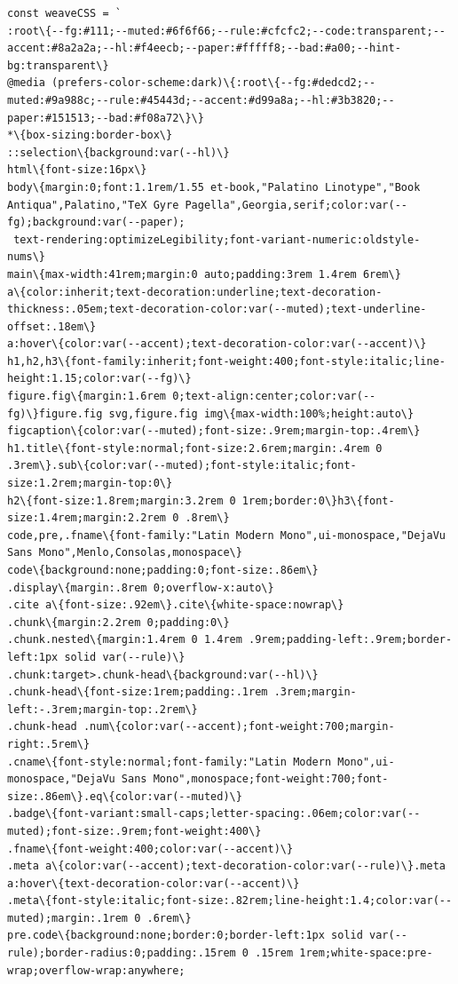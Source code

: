 \documentclass[10pt,a4paper]{article}
\newcounter{chunk}
\begin{document}
\begin{Verbatim}
const weaveCSS = `
:root\{--fg:#111;--muted:#6f6f66;--rule:#cfcfc2;--code:transparent;--accent:#8a2a2a;--hl:#f4eecb;--paper:#fffff8;--bad:#a00;--hint-bg:transparent\}
@media (prefers-color-scheme:dark)\{:root\{--fg:#dedcd2;--muted:#9a988c;--rule:#45443d;--accent:#d99a8a;--hl:#3b3820;--paper:#151513;--bad:#f08a72\}\}
*\{box-sizing:border-box\}
::selection\{background:var(--hl)\}
html\{font-size:16px\}
body\{margin:0;font:1.1rem/1.55 et-book,"Palatino Linotype","Book Antiqua",Palatino,"TeX Gyre Pagella",Georgia,serif;color:var(--fg);background:var(--paper);
 text-rendering:optimizeLegibility;font-variant-numeric:oldstyle-nums\}
main\{max-width:41rem;margin:0 auto;padding:3rem 1.4rem 6rem\}
a\{color:inherit;text-decoration:underline;text-decoration-thickness:.05em;text-decoration-color:var(--muted);text-underline-offset:.18em\}
a:hover\{color:var(--accent);text-decoration-color:var(--accent)\}
h1,h2,h3\{font-family:inherit;font-weight:400;font-style:italic;line-height:1.15;color:var(--fg)\}
figure.fig\{margin:1.6rem 0;text-align:center;color:var(--fg)\}figure.fig svg,figure.fig img\{max-width:100%;height:auto\}
figcaption\{color:var(--muted);font-size:.9rem;margin-top:.4rem\}
h1.title\{font-style:normal;font-size:2.6rem;margin:.4rem 0 .3rem\}.sub\{color:var(--muted);font-style:italic;font-size:1.2rem;margin-top:0\}
h2\{font-size:1.8rem;margin:3.2rem 0 1rem;border:0\}h3\{font-size:1.4rem;margin:2.2rem 0 .8rem\}
code,pre,.fname\{font-family:"Latin Modern Mono",ui-monospace,"DejaVu Sans Mono",Menlo,Consolas,monospace\}
code\{background:none;padding:0;font-size:.86em\}
.display\{margin:.8rem 0;overflow-x:auto\}
.cite a\{font-size:.92em\}.cite\{white-space:nowrap\}
.chunk\{margin:2.2rem 0;padding:0\}
.chunk.nested\{margin:1.4rem 0 1.4rem .9rem;padding-left:.9rem;border-left:1px solid var(--rule)\}
.chunk:target>.chunk-head\{background:var(--hl)\}
.chunk-head\{font-size:1rem;padding:.1rem .3rem;margin-left:-.3rem;margin-top:.2rem\}
.chunk-head .num\{color:var(--accent);font-weight:700;margin-right:.5rem\}
.cname\{font-style:normal;font-family:"Latin Modern Mono",ui-monospace,"DejaVu Sans Mono",monospace;font-weight:700;font-size:.86em\}.eq\{color:var(--muted)\}
.badge\{font-variant:small-caps;letter-spacing:.06em;color:var(--muted);font-size:.9rem;font-weight:400\}
.fname\{font-weight:400;color:var(--accent)\}
.meta a\{color:var(--accent);text-decoration-color:var(--rule)\}.meta a:hover\{text-decoration-color:var(--accent)\}
.meta\{font-style:italic;font-size:.82rem;line-height:1.4;color:var(--muted);margin:.1rem 0 .6rem\}
pre.code\{background:none;border:0;border-left:1px solid var(--rule);border-radius:0;padding:.15rem 0 .15rem 1rem;white-space:pre-wrap;overflow-wrap:anywhere;

\end{Verbatim}
\end{document}
